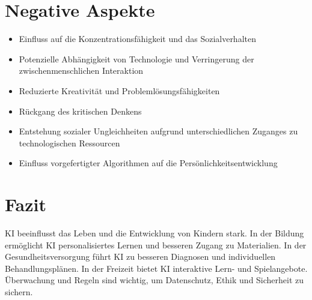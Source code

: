 \documentclass{article}
\begin{document}
\section{Negative Aspekte}

\begin{itemize}

    \item Einfluss auf die Konzentrationsfähigkeit und das Sozialverhalten
    \item Potenzielle Abhängigkeit von Technologie und Verringerung der zwischenmenschlichen Interaktion
    \item Reduzierte Kreativität und Problemlösungsfähigkeiten
    \item Rückgang des kritischen Denkens
    \item Entstehung sozialer Ungleichheiten aufgrund unterschiedlichen Zuganges zu technologischen Ressourcen
    \item Einfluss vorgefertigter Algorithmen auf die Persönlichkeitsentwicklung

\end{itemize}

\section{Fazit}

KI beeinflusst das Leben und die Entwicklung von Kindern stark. In der Bildung ermöglicht KI personalisiertes Lernen und besseren Zugang zu Materialien. In der Gesundheitsversorgung führt KI zu besseren Diagnosen und individuellen Behandlungsplänen. In der Freizeit bietet KI interaktive Lern- und Spielangebote. Überwachung und Regeln sind wichtig, um Datenschutz, Ethik und Sicherheit zu sichern. 

\nocite{*}
\printbibliography
\end{document}
